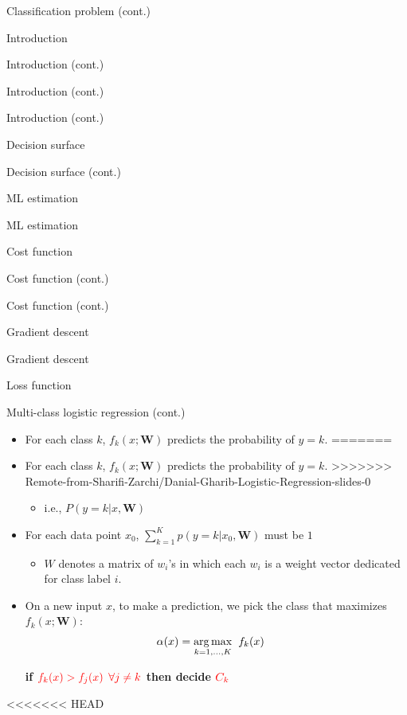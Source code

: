 \documentclass[serif, aspectratio=169]{beamer}
\begin{document}
\begin{frame}{Classification problem (cont.)}
\begin{itemize}
\begin{frame}{Introduction}
\begin{itemize}
\begin{frame}{Introduction (cont.)}
\begin{frame}{Introduction (cont.)}
\begin{frame}{Introduction (cont.)}
\begin{frame}{Decision surface}
\begin{itemize}
\begin{frame}{Decision surface (cont.)}
\begin{frame}{ML estimation}
\begin{frame}{ML estimation}
\begin{itemize}
\begin{frame}{Cost function}
\begin{frame}{Cost function (cont.)}
\begin{itemize}
\begin{itemize}
\begin{frame}{Cost function (cont.)}
\begin{frame}{Gradient descent}
\begin{frame}{Gradient descent}
\begin{frame}{Loss function}
\begin{frame}{Multi-class logistic regression (cont.)}
\begin{itemize}
         \item For each class $k$, $f_k(x; \mathbf{W})$ predicts the probability of $y=k$.
=======
        \item For each class $k$, $f_k(x; \mathbf{W})$ predicts the probability of $y=k$.
>>>>>>> Remote-from-Sharifi-Zarchi/Danial-Gharib-Logistic-Regression-slides-0
            \begin{itemize}
                \item i.e., $P(y=k|x, \mathbf{W})$
            \end{itemize}
        \item For each data point $x_0$, $\sum _{k=1}^{K} p(y=k|x_0, \mathbf{W})$ must be $1$
            \begin{itemize}
                \item $W$ denotes a matrix of $w_i$'s in which each $w_i$ is a weight vector dedicated for class label $i$.
            \end{itemize}
        \item On a new input $x$, to make a prediction, we pick the class that maximizes $f_k(x; \mathbf{W})$:
            \begin{align*}
                \alpha (x) &= \underset{k=1, \dots , K}{\arg\max} \hspace{0.2cm} f_k(x) 
            \end{align*}
            \begin{center}
                \textbf{if $\color{red} f_k(x) > f_j(x)$ $\color{red} \forall j \neq k$ then decide $\color{red} C_k$}
            \end{center}
    \end{itemize}
\end{frame}

<<<<<<< HEAD


\end{frame}
\end{frame}
\end{frame}
\end{frame}
\end{itemize}
\end{itemize}
\end{frame}
\end{frame}
\end{itemize}
\end{frame}
\end{frame}
\end{frame}
\end{itemize}
\end{frame}
\end{frame}
\end{frame}
\end{frame}
\end{itemize}
\end{frame}
\end{itemize}
\end{frame}
\end{document}
